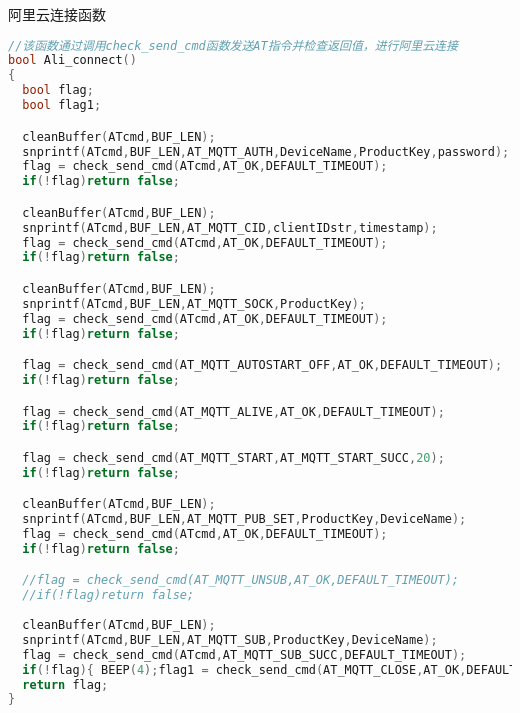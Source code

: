 \documentclass[12pt,hyperref,a4paper,UTF8]{ctexart}
\begin{document}
阿里云连接函数
\begin{lstlisting}[language=C++]
    //该函数通过调用check_send_cmd函数发送AT指令并检查返回值，进行阿里云连接
bool Ali_connect()
{
  bool flag;
  bool flag1;

  cleanBuffer(ATcmd,BUF_LEN);
  snprintf(ATcmd,BUF_LEN,AT_MQTT_AUTH,DeviceName,ProductKey,password);
  flag = check_send_cmd(ATcmd,AT_OK,DEFAULT_TIMEOUT);
  if(!flag)return false;

  cleanBuffer(ATcmd,BUF_LEN);
  snprintf(ATcmd,BUF_LEN,AT_MQTT_CID,clientIDstr,timestamp);
  flag = check_send_cmd(ATcmd,AT_OK,DEFAULT_TIMEOUT);
  if(!flag)return false;

  cleanBuffer(ATcmd,BUF_LEN);
  snprintf(ATcmd,BUF_LEN,AT_MQTT_SOCK,ProductKey);
  flag = check_send_cmd(ATcmd,AT_OK,DEFAULT_TIMEOUT);
  if(!flag)return false;

  flag = check_send_cmd(AT_MQTT_AUTOSTART_OFF,AT_OK,DEFAULT_TIMEOUT);
  if(!flag)return false;

  flag = check_send_cmd(AT_MQTT_ALIVE,AT_OK,DEFAULT_TIMEOUT);
  if(!flag)return false;

  flag = check_send_cmd(AT_MQTT_START,AT_MQTT_START_SUCC,20);
  if(!flag)return false;

  cleanBuffer(ATcmd,BUF_LEN);
  snprintf(ATcmd,BUF_LEN,AT_MQTT_PUB_SET,ProductKey,DeviceName);
  flag = check_send_cmd(ATcmd,AT_OK,DEFAULT_TIMEOUT);
  if(!flag)return false;

  //flag = check_send_cmd(AT_MQTT_UNSUB,AT_OK,DEFAULT_TIMEOUT);
  //if(!flag)return false;
  
  cleanBuffer(ATcmd,BUF_LEN);
  snprintf(ATcmd,BUF_LEN,AT_MQTT_SUB,ProductKey,DeviceName);
  flag = check_send_cmd(ATcmd,AT_MQTT_SUB_SUCC,DEFAULT_TIMEOUT);
  if(!flag){ BEEP(4);flag1 = check_send_cmd(AT_MQTT_CLOSE,AT_OK,DEFAULT_TIMEOUT);}
  return flag;
}
\end{lstlisting}


    

\end{document}
